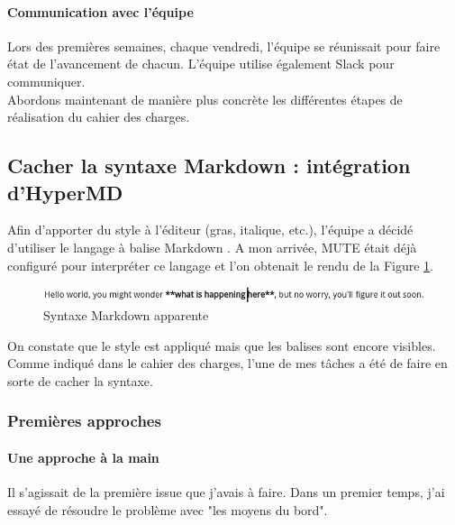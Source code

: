 \documentclass[12pt]{article}
\begin{document}
\paragraph{Communication avec l'équipe}
Lors des premières semaines, chaque vendredi, l'équipe se réunissait pour faire état de l'avancement de chacun.
L'équipe utilise également Slack \cite{slack} pour communiquer.\\

\newpage
Abordons maintenant de manière plus concrète les différentes étapes de réalisation du cahier des charges.\\

\subsection{Cacher la syntaxe Markdown : intégration d'HyperMD}
Afin d'apporter du style à l'éditeur (gras, italique, etc.), l'équipe a décidé d'utiliser le langage à balise Markdown \cite{markdown}. A mon arrivée, MUTE était déjà configuré pour interpréter ce langage et l'on obtenait le rendu de la Figure \ref{fig:gallery3}.

\begin{figure}[H]
    \centering
    \includegraphics[scale=0.65]{gallery/style_example.jpg}
    \caption[nom dans le sommaire]{Syntaxe Markdown apparente}
    \label{fig:gallery3}
\end{figure}

On constate que le style est appliqué mais que les balises sont encore visibles. Comme indiqué dans le cahier des charges, l'une de mes tâches a été de faire en sorte de cacher la syntaxe.

\subsubsection{Premières approches}
\paragraph{Une approche à la main}
Il s'agissait de la première issue que j'avais à faire. Dans un premier temps, j'ai essayé de résoudre le problème avec "les moyens du bord".
\end{document}
